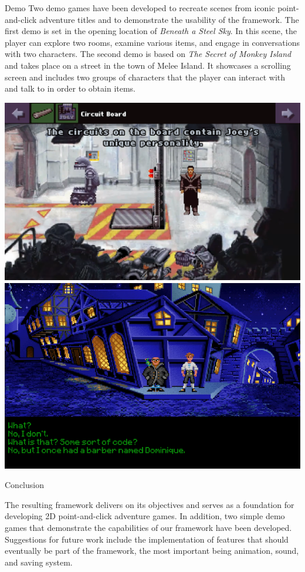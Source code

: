 \documentclass[portrait,a0paper,fontscale=0.34]{baposter}
\begin{document}
\begin{poster}
\begin{posterbox}[column=1, name=result2, below=ds]{Demo}
Two demo games have been developed to recreate scenes from iconic point-and-click adventure titles and to demonstrate the usability of the framework. The first demo is set in the opening location of \textit{Beneath a Steel Sky}. In this scene, the player can explore two rooms, examine various items, and engage in conversations with two characters. The second demo is based on \textit{The Secret of Monkey Island} and takes place on a street in the town of Melee Island. It showcases a scrolling screen and includes two groups of characters that the player can interact with and talk to in order to obtain items. 
\begin{center}
\includegraphics[width=0.506\linewidth]{img/manual.png}
\includegraphics[width=0.486\linewidth]{img/manual-tsomi.png}
\end{center}
\end{posterbox}


\begin{posterbox}[column=1, name=conclusion, below=result2, headerColorOne=yellow!80!orange!95!black, boxColorOne=yellow!33]{Conclusion}


The resulting framework delivers on its objectives and serves as a foundation for developing 2D point-and-click adventure games. In addition, two simple demo games that demonstrate the capabilities of our framework have been developed. Suggestions for future work include the implementation of features that should eventually be part of the framework, the most important being animation, sound, and saving system. 


\end{posterbox}
\end{poster}
\end{document}
